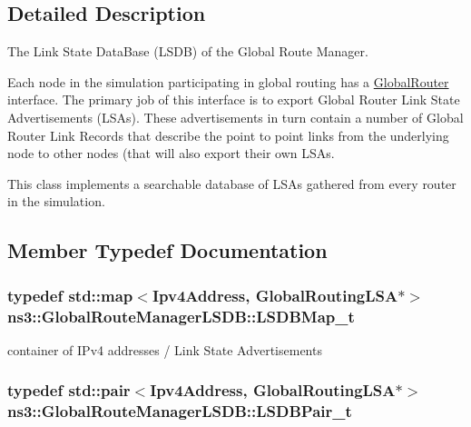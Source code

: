 \subsection{Detailed Description}
The Link State Data\+Base (L\+S\+DB) of the Global Route Manager. 

Each node in the simulation participating in global routing has a \hyperlink{classns3_1_1GlobalRouter}{Global\+Router} interface. The primary job of this interface is to export Global Router Link State Advertisements (L\+S\+As). These advertisements in turn contain a number of Global Router Link Records that describe the point to point links from the underlying node to other nodes (that will also export their own L\+S\+As.

This class implements a searchable database of L\+S\+As gathered from every router in the simulation. 

\subsection{Member Typedef Documentation}
\subsubsection[{\texorpdfstring{L\+S\+D\+B\+Map\+\_\+t}{LSDBMap_t}}]{\setlength{\rightskip}{0pt plus 5cm}typedef std\+::map$<${\bf Ipv4\+Address}, {\bf Global\+Routing\+L\+SA}$\ast$$>$ {\bf ns3\+::\+Global\+Route\+Manager\+L\+S\+D\+B\+::\+L\+S\+D\+B\+Map\+\_\+t}\hspace{0.3cm}{\ttfamily [private]}}\hypertarget{classns3_1_1GlobalRouteManagerLSDB_a1422d1cc4a1e5a1122563e6ec4c12758}{}\label{classns3_1_1GlobalRouteManagerLSDB_a1422d1cc4a1e5a1122563e6ec4c12758}


container of I\+Pv4 addresses / Link State Advertisements 

\subsubsection[{\texorpdfstring{L\+S\+D\+B\+Pair\+\_\+t}{LSDBPair_t}}]{\setlength{\rightskip}{0pt plus 5cm}typedef std\+::pair$<${\bf Ipv4\+Address}, {\bf Global\+Routing\+L\+SA}$\ast$$>$ {\bf ns3\+::\+Global\+Route\+Manager\+L\+S\+D\+B\+::\+L\+S\+D\+B\+Pair\+\_\+t}\hspace{0.3cm}{\ttfamily [private]}}\hypertarget{classns3_1_1GlobalRouteManagerLSDB_a3fb44fd823a1445363655df4143f1f4e}{}\label{classns3_1_1GlobalRouteManagerLSDB_a3fb44fd823a1445363655df4143f1f4e}


